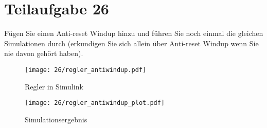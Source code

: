 \section{Teilaufgabe 26}
\begin{aufgabe}
    Fügen Sie einen Anti-reset Windup hinzu und führen Sie noch einmal die 
    gleichen Simulationen durch (erkundigen Sie sich allein über Anti-reset 
    Windup wenn Sie nie davon gehört haben).
\end{aufgabe}
\begin{figure}[h!]
    \centering
    \texttt{[image: 26/regler\_antiwindup.pdf]}
    \caption{Regler in Simulink}
    \label{fig:26}
\end{figure}
\begin{figure}[h!]
    \centering
    \texttt{[image: 26/regler\_antiwindup\_plot.pdf]}
    \caption{Simulationsergebnis}
    \label{fig:26plot}
\end{figure}
